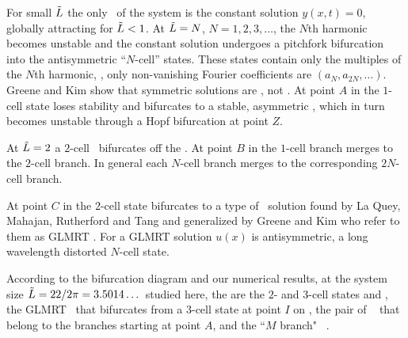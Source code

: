 For small $\tilde{L}$ the only \eqv\ of the system is the
constant solution $y(x,t)=0$, globally attracting
for $\tilde{L}<1$. At $\tilde{L}=N$, $N=1,2,3, \dots$,
the $N$th harmonic becomes unstable and the constant solution
undergoes a pitchfork bifurcation into
the antisymmetric ``$N$-cell'' states.
These states contain only the multiples of the $N$th
harmonic, {\ie}, only non-vanishing Fourier coefficients
are $(a_N,a_{2N},\dots)$.
Greene and Kim show that symmetric solutions are \eqva, not \reqva.
At point $A$ in 
the $1$-cell state loses stability
and bifurcates to a stable,
asymmetric \reqv, which in turn becomes unstable
through a Hopf bifurcation at point $Z$.


At $\tilde{L}=2$ a $2$-cell \eqv\ bifurcates off the  \eqv.
At point $B$ in  the $1$-cell branch merges 
to the $2$-cell branch.  In general each $N$-cell branch merges 
to the corresponding $2N$-cell branch.

At point $C$ in 
the $2$-cell state bifurcates to a type of \eqv\ solution
found by La Quey, Mahajan, Rutherford and Tang 
and generalized by Greene and Kim who refer to them as GLMRT \eqva.
For a GLMRT solution $u(x)$ is antisymmetric,
a long wavelength distorted $N$-cell state.


According to the bifurcation diagram
and our numerical results,
at the system size $\tilde{L}=22/2\pi = 3.5014\dots$ studied here,
the {\eqva} are the $2$- and $3$-cell states  and ,
the GLMRT \eqv\ that bifurcates from a $3$-cell state at point $I$
on ,
the pair of \reqva\  
that belong to the branches starting at point
$A$,
and the ``$M$ branch"  \reqva\ .

